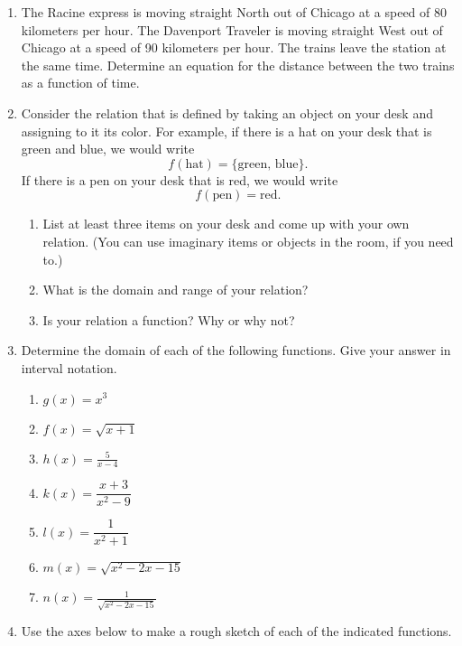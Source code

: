 \begin{enumerate}
\item The Racine express is moving straight North out of Chicago at a
  speed of 80 kilometers per hour. The Davenport Traveler is moving
  straight West out of Chicago at a speed of 90 kilometers per
  hour. The trains leave the station at the same time. Determine an
  equation for the distance between the two trains as a function of
  time.

\item Consider the relation that is defined by taking an object on
  your desk and assigning to it its color.  For example, if there is a
  hat on your desk that is green and blue, we would write
  $$f(\text{hat}) = \{\text{green, blue}\}.$$
  If there is a pen on your desk that is red, we would write
  $$f(\text{pen}) = \text{red}.$$
\begin{enumerate}
\item List at least three items on your desk and come up with your own
  relation. (You can use imaginary items or objects in the room, if
  you need to.)
\item What is the domain and range of your relation?
\item Is your relation a function?  Why or why not?
\end{enumerate}

\item Determine the domain of each of the following functions. Give your answer in interval notation.%
\begin{enumerate}
\item $g(x) = x^3$
\item $f(x)=\sqrt{x+1}$
\item $h(x)=\frac{5}{x-4}$
\item $k(x) = \dfrac{x+3}{x^2-9}$
\item $l(x)=\dfrac{1}{x^2+1}$
\item $m(x) = \sqrt{x^2-2x-15}$
\item $n(x) = \frac{1}{\sqrt{x^2-2x-15}}$
\end{enumerate}

\item Use the axes below to make a rough sketch of each of the
  indicated functions.
  \pagebreak[4]
  \begin{enumerate}


\end{enumerate}
\end{enumerate}
